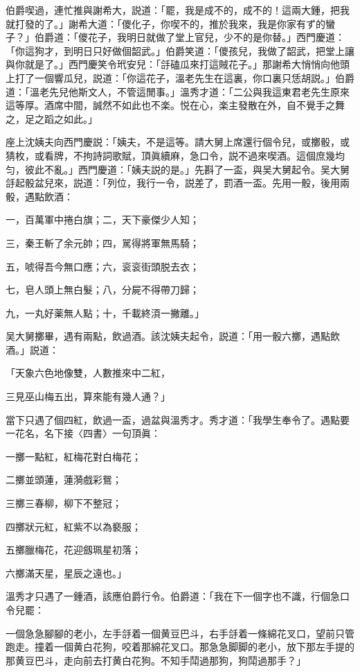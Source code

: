 伯爵喫過，連忙推與謝希大，説道：「罷，我是成不的，成不的！這兩大鍾，把我就打發的了。」謝希大道：「儍化子，你喫不的，推於我來，我是你家有ず的蠻子？」伯爵道：「儍花子，我明日就做了堂上官兒，少不的是你替。」西門慶道：「你這狗才，到明日只好做個韶武。」伯爵笑道：「儍孩兒，我做了韶武，把堂上讓與你就是了。」西門慶笑令玳安兒：「㧱磕瓜來打這賊花子。」那謝希大悄悄向他頭上打了一個響瓜兒，説道：「你這花子，溫老先生在這裏，你口裏只恁胡説。」伯爵道：「溫老先兒他斯文人，不管這閒事。」溫秀才道：「二公與我這東君老先生原來這等厚。酒席中間，誠然不如此也不楽。悦在心，楽主發散在外，自不覺手之舞之，足之蹈之如此。」

座上沈姨夫向西門慶説：「姨夫，不是這等。請大舅上席還行個令兒，或擲骰，或猜枚，或看牌，不拘詩詞歌賦，頂眞續麻，急口令，説不過來喫酒。這個庶幾均匀，彼此不亂。」西門慶道：「姨夫説的是。」先斟了一盃，與吴大舅起令。吴大舅㧱起骰盆兒來，説道：「列位，我行一令，説差了，罰酒一盃。先用一骰，後用兩骰，遇點飲酒：

一，百萬軍中捲白旗；二，天下豪傑少人知；

三，秦王斬了余元帥；四，駡得將軍無馬騎；

五，唬得吾今無口應；六，衮衮街頭脱去衣；

七，皂人頭上無白髮；八，分屍不得帶刀歸；

九，一丸好薬無人點；十，千載終湏一撇離。」

吴大舅擲畢，遇有兩點，飲過酒。該沈姨夫起令，説道：「用一骰六擲，遇點飲酒。」説道：

「天象六色地像雙，人數推來中二紅，

三見巫山梅五出，算來能有幾人通？」

當下只遇了個四紅，飲過一盃，過盆與溫秀才。秀才道：「我學生奉令了。遇點要一花名，名下接〈四書〉一句頂眞：

一擲一點紅，紅梅花對白梅花；

二擲並頭蓮，蓮漪戲彩鴛；

三擲三春柳，柳下不整冠；

四擲狀元紅，紅紫不以為褻服；

五擲臘梅花，花迎劔珮星初落；

六擲滿天星，星辰之遠也。」

溫秀才只遇了一鍾酒，該應伯爵行令。伯爵道：「我在下一個字也不識，行個急口令兒罷：

一個急急腳腳的老小，左手㧱着一個黄豆巴斗，右手㧱着一條綿花叉口，望前只管跑走。撞着一個黄白花狗，咬着那綿花叉口。那急急脚脚的老小，放下那左手提的那黄豆巴斗，走向前去打黄白花狗。不知手鬦過那狗，狗鬦過那手？」

